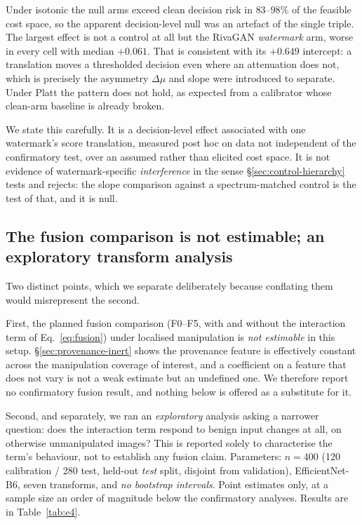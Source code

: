 \documentclass[journal]{IEEEtran}
\begin{document}
Under isotonic the null arms exceed clean decision risk in $83$--$98\%$ of the
feasible cost space, so the apparent decision-level null was an artefact of
the single triple. The largest effect is not a control at all but the RivaGAN
\emph{watermark} arm, worse in every cell with median $+0.061$. That is
consistent with its $+0.649$ intercept: a translation moves a thresholded
decision even where an attenuation does not, which is precisely the asymmetry
$\Delta\mu$ and slope were introduced to separate. Under Platt the pattern
does not hold, as expected from a calibrator whose clean-arm baseline is
already broken.

We state this carefully. It is a decision-level effect associated with one
watermark's score translation, measured post hoc on data not independent of
the confirmatory test, over an assumed rather than elicited cost space. It is
not evidence of watermark-specific \emph{interference} in the sense
\S\ref{sec:control-hierarchy} tests and rejects: the slope comparison against
a spectrum-matched control is the test of that, and it is null.

\subsection{The fusion comparison is not estimable; an exploratory transform
analysis}
\label{sec:e4e5}

Two distinct points, which we separate deliberately because conflating them
would misrepresent the second.

First, the planned fusion comparison (F0--F5, with and without the
interaction term of Eq.~\ref{eq:fusion}) under localised manipulation is
\emph{not estimable} in this setup. \S\ref{sec:provenance-inert} shows the
provenance feature is effectively constant across the manipulation coverage of
interest, and a coefficient on a feature that does not vary is not a weak
estimate but an undefined one. We therefore report no confirmatory fusion
result, and nothing below is offered as a substitute for it.

Second, and separately, we ran an \emph{exploratory} analysis asking a
narrower question: does the interaction term respond to benign input changes
at all, on otherwise unmanipulated images? This is reported solely to
characterise the term's behaviour, not to establish any fusion claim.
Parameters: $n{=}400$ (120 calibration / 280 test, held-out \emph{test} split,
disjoint from validation), EfficientNet-B6, seven transforms, and
\emph{no bootstrap intervals}. Point estimates only, at a sample size an
order of magnitude below the confirmatory analyses. Results are in
Table~\ref{tab:e4}.
\end{document}
